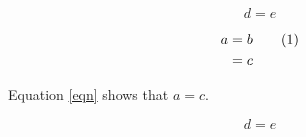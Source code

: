 \documentclass{article}
\newcommand\numberthis{\addtocounter{equation}{1}\tag{\theequation}}
\begin{document}
\begin{equation}
d = e
\end{equation}

\begin{align*}
a &=b  \numberthis \label{eqn} \\
  &=c \\
\end{align*}

Equation \eqref{eqn} shows that $a=c$.

\begin{equation}
d = e
\end{equation}
\end{document}
